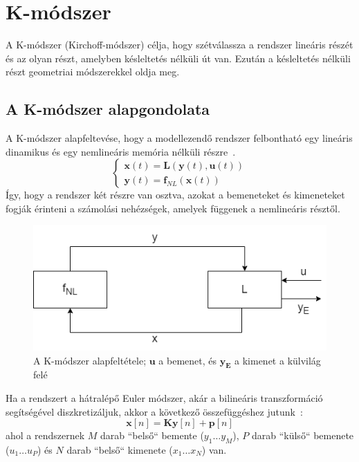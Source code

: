 \chapter{K-módszer}

A K-módszer (Kirchoff-módszer) célja, hogy szétválassza a rendszer lineáris részét és az olyan 
részt, amelyben késleltetés nélküli út van. Ezután a késleltetés nélküli részt 
geometriai módszerekkel oldja meg.

\section{A K-módszer alapgondolata}\label{KSep}
A K-módszer alapfeltevése, hogy a modellezendő rendszer felbontható egy lineáris dinamikus és egy 
nemlineáris memória nélküli részre~\cite{borin}\cite{borin2}\cite{otherK}. 
\begin{equation}
    \begin{cases}
        \mathbf{x}(t)=\mathbf{L}(\mathbf{y}(t),\mathbf{u}(t)) \\
        \mathbf{y}(t)=\mathbf{f}_{NL}(\mathbf{x}(t)) 
    \end{cases} 
\end{equation}
Így, hogy a rendszer két részre van osztva, azokat a bemeneteket és kimeneteket fogják érinteni 
a számolási nehézségek, amelyek függenek a nemlineáris résztől.
\begin{figure}[H]
    \centering
    \includegraphics[scale=0.5]{figures/xy.png}
    \caption{A K-módszer alapfeltétele; $\mathbf{u}$ a bemenet, és $\mathbf{y_E}$ a kimenet a külvilág felé}
\end{figure}
Ha a rendszert a hátralépő Euler módszer, akár a bilineáris transzformáció segítségével diszkretizáljuk, akkor a következő összefüggéshez jutunk~\cite{borin}:
\begin{equation}
    \mathbf{x}[n]=\mathbf{Ky}[n]+\mathbf{p}[n]    
\end{equation}
ahol a rendszernek $M$ darab ``belső`` bemente ($y_1 \ldots y_M$), $P$ darab ``külső`` bemenete ($u_1 \ldots u_P$) és $N$ darab ``belső`` kimenete ($x_1 \ldots x_N$) van.

